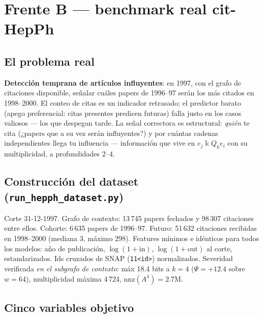 \documentclass[11pt]{article}
\newcommand{\kk}{\Bbbk}
\newcommand{\kQ}{\kk Q}
\begin{document}
\section{Frente B --- benchmark real cit-HepPh}

\subsection{El problema real}

\textbf{Detecci\'on temprana de art\'iculos influyentes}: en 1997, con el
grafo de citaciones disponible, se\~nalar cu\'ales papers de 1996--97
ser\'an los m\'as citados en 1998--2000. El conteo de citas es un indicador
retrasado; el predictor barato (apego preferencial: citas presentes
predicen futuras) falla justo en los casos valiosos --- los que despegan
tarde. La se\~nal correctora es estructural: \emph{qui\'en} te cita (¿papers
que a su vez ser\'an influyentes?) y por cu\'antas cadenas independientes
llega tu influencia --- informaci\'on que vive en $e_j\kQ_k e_i$ con su
multiplicidad, a profundidades $2$--$4$.

\subsection{Construcci\'on del dataset (\texttt{run\_hepph\_dataset.py})}

Corte 31-12-1997. Grafo de contexto: 13\,745 papers fechados y 98\,307
citaciones entre ellos. Cohorte: 6\,635 papers de 1996--97. Futuro: 51\,632
citaciones recibidas en 1998--2000 (mediana 3, m\'aximo 298). Features
m\'inimos e id\'enticos para todos los modelos: a\~no de publicaci\'on,
$\log(1{+}\mathrm{in})$, $\log(1{+}\mathrm{out})$ al corte, estandarizados.
Ids cruzados de SNAP (\texttt{11<id>}) normalizados. Severidad verificada
\emph{en el subgrafo de contexto}: m\'ax $18.4$ bits a $k{=}4$
($\Psi=+12.4$ sobre $w{=}64$), multiplicidad m\'axima 4\,724,
$\mathrm{nnz}(A^4)=2.7$M.

\subsection{Cinco variables objetivo}
\end{document}
